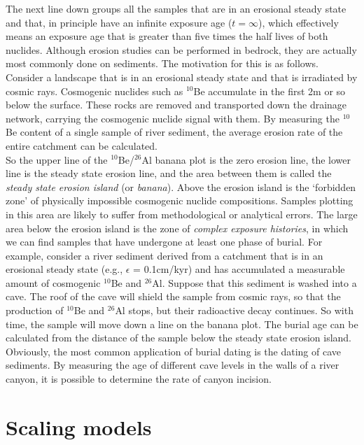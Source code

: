 \documentclass{book}
\begin{document}
The next line down groups all the samples that are in an erosional
steady state and that, in principle have an infinite exposure age
($t=\infty$), which effectively means an exposure age that is greater
than five times the half lives of both nuclides.  Although erosion
studies can be performed in bedrock, they are actually most commonly
done on sediments. The motivation for this is as follows. Consider a
landscape that is in an erosional steady state and that is irradiated
by cosmic rays. Cosmogenic nuclides such as $^{10}$Be accumulate in
the first 2m or so below the surface. These rocks are removed and
transported down the drainage network, carrying the cosmogenic nuclide
signal with them. By measuring the $^{10}$Be content of a single
sample of river sediment, the average erosion rate of the entire
catchment can be calculated.\\

So the upper line of the $^{10}$Be/$^{26}$Al banana plot is the zero
erosion line, the lower line is the steady state erosion line, and the
area between them is called the \emph{steady state erosion island} (or
\emph{banana}).  Above the erosion island is the `forbidden zone' of
physically impossible cosmogenic nuclide compositions. Samples
plotting in this area are likely to suffer from methodological or
analytical errors. The large area below the erosion island is the zone
of \emph{complex exposure histories}, in which we can find samples
that have undergone at least one phase of burial. For example,
consider a river sediment derived from a catchment that is in an
erosional steady state (e.g., $\epsilon$ = 0.1cm/kyr) and has
accumulated a measurable amount of cosmogenic $^{10}$Be and
$^{26}$Al. Suppose that this sediment is washed into a cave.  The roof
of the cave will shield the sample from cosmic rays, so that the
production of $^{10}$Be and $^{26}$Al stops, but their radioactive
decay continues. So with time, the sample will move down a line on the
banana plot. The burial age can be calculated from the distance of the
sample below the steady state erosion island.  Obviously, the most
common application of burial dating is the dating of cave
sediments. By measuring the age of different cave levels in the walls
of a river canyon, it is possible to determine the rate of canyon
incision.

\section{Scaling models}
\label{sec:scaling}
\end{document}

